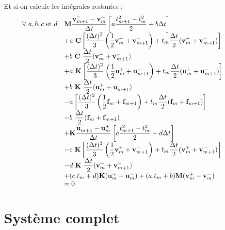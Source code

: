 \documentclass[12pt,a4paper]{report}
\begin{document}
Et si on calcule les intégrales restantes :
\begin{equation}
\begin{array}{r l}
	\!\!\!\!\!\! \forall~a,b,c \text{ et }d
	&\displaystyle
	\mathbf{M}\frac{\mathbf{v}_{m+1}^- - \mathbf{v}^+_m}{\Delta t}
		\left[	a\frac{t_{m+1}^2 - t_m^2}{2} + b \Delta t
		\right]
	\\ &+\displaystyle
		a ~\mathbf{C} \left[
			\frac{(\Delta t)^2}{3}
				\left( \frac{1}{2} \mathbf{v}_m^+ + \mathbf{v}_{m+1}^- \right)
			+t_m \frac{\Delta t}{2} (\mathbf{v}_m^+ + \mathbf{v}_{m+1}^-) 
		\right]
	\\ &+\displaystyle
		 b~ \mathbf{C}~ \frac{\Delta t}{2}  (\mathbf{v}_m^+ + \mathbf{v}_{m+1}^-)
	\\ &+\displaystyle
		a ~\mathbf{K} \left[
			\frac{(\Delta t)^2}{3}
				\left( \frac{1}{2} \mathbf{u}_m^+ + \mathbf{u}_{m+1}^- \right)
			+t_m \frac{\Delta t}{2} (\mathbf{u}_m^+ + \mathbf{u}_{m+1}^-) 
		\right]
	\\ &+\displaystyle
		 b~ \mathbf{K}~ \frac{\Delta t}{2}  (\mathbf{u}_m^+ + \mathbf{u}_{m+1}^-)
	\\ &-\displaystyle
		a \left[
			\frac{(\Delta t)^2}{3}
				\left( \frac{1}{2} \mathbf{f}_m + \mathbf{f}_{m+1} \right)
			+t_m \frac{\Delta t}{2} (\mathbf{f}_m + \mathbf{f}_{m+1}) 
		\right]
	\\ &-\displaystyle
		 b~ \frac{\Delta t}{2}  (\mathbf{f}_m + \mathbf{f}_{m+1})
	\\ &+\displaystyle	
	\mathbf{K}\frac{\mathbf{u}^-_{m+1} - \mathbf{u}^+_m}{\Delta t}
	    \left[	c\frac{t_{m+1}^2 - t_m^2}{2} + d \Delta t
		\right]
	\\ &-\displaystyle
		c ~\mathbf{K} \left[
			\frac{(\Delta t)^2}{3}
				\left( \frac{1}{2} \mathbf{v}_m^+ + \mathbf{v}_{m+1}^- \right)
			+t_m \frac{\Delta t}{2} (\mathbf{v}_m^+ + \mathbf{v}_{m+1}^-) 
		\right]
	\\ &-\displaystyle
		 d~ \mathbf{K}~ \frac{\Delta t}{2}  (\mathbf{v}_m^+ + \mathbf{v}_{m+1}^-)
	\\
	  &+ (c.t_m+d) \mathbf{K} (\mathbf{u}_m^+ - \mathbf{u}_m^-)
	   +  (a.t_m+b) \mathbf{M}(\mathbf{v}_m^+ - \mathbf{v}_m^-)
	\\&=0
\end{array}
\end{equation}

\section{Système complet}
\end{document}
